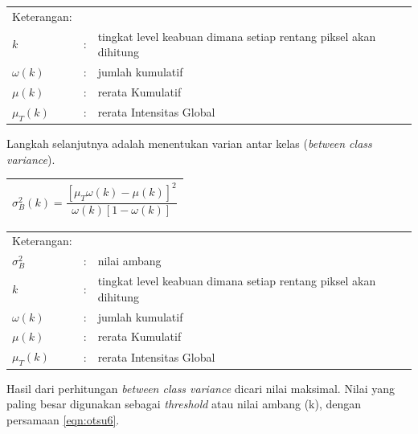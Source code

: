 \noindent
\renewcommand{\arraystretch}{1}
\begin{tabularx}{\textwidth}{lll}
	\hline
	Keterangan: \\
	$k$ & : &  tingkat level keabuan  dimana  setiap  rentang  piksel  akan  dihitung\\
	$\omega (k)$ & : & jumlah kumulatif\\
	$\mu (k)$ & : & rerata Kumulatif\\
	$\mu _{T} (k)$ & : & rerata Intensitas Global\\
	\hline
\end{tabularx}
\vspace{4.5pt}

Langkah selanjutnya adalah menentukan varian antar kelas  (\textit{between class variance}).

\begin{table}[H]
	\small
	\begin{adjustbox}{width=1\textwidth}
		\begin{tabular}{|p{13.55cm}|}
			\hline
			\begin{equation} \label{eqn:otsu5}
			\displaystyle
			\sigma_{B}^{2} (k)  = \frac{[\mu _{T}\omega (k)-\mu (k)] ^2}{\omega (k)[1 - \omega (k)]}
			\end{equation} \\
			\hline
		\end{tabular}
	\end{adjustbox}
\end{table}

\noindent
\renewcommand{\arraystretch}{1}
\begin{tabularx}{\textwidth}{lll}
	\hline
	Keterangan: \\
	$\sigma_{B}^{2}$ & : & nilai ambang\\
	$k$ & : &  tingkat level keabuan  dimana  setiap  rentang  piksel  akan  dihitung\\
	$\omega (k)$ & : & jumlah kumulatif\\
	$\mu (k)$ & : & rerata Kumulatif\\
	$\mu _{T} (k)$ & : & rerata Intensitas Global\\
	\hline
\end{tabularx}
\vspace{4.5pt}

Hasil  dari  perhitungan \textit{between class variance} dicari   nilai   maksimal.   Nilai   yang   paling   besar digunakan  sebagai \textit{threshold} atau  nilai  ambang  (k), dengan persamaan \eqref{eqn:otsu6}.


